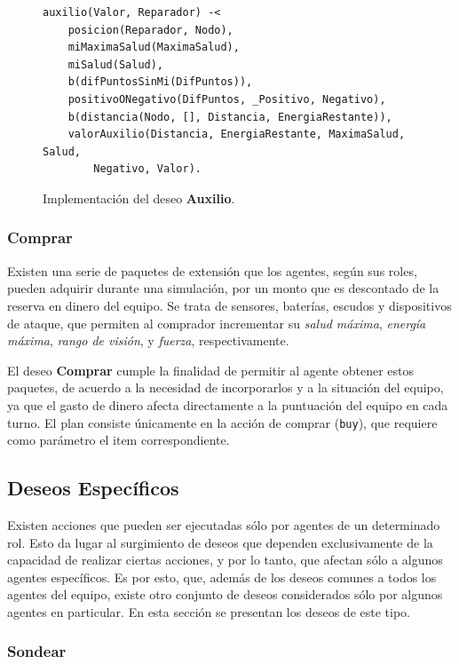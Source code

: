 \documentclass[oneside]{book}
\theoremstyle{definition}
\theoremstyle{example}
\begin{document}
\begin{figure}
\begin{verbatim}
auxilio(Valor, Reparador) -<
	posicion(Reparador, Nodo),
	miMaximaSalud(MaximaSalud),
	miSalud(Salud),
	b(difPuntosSinMi(DifPuntos)),
	positivoONegativo(DifPuntos, _Positivo, Negativo),
	b(distancia(Nodo, [], Distancia, EnergiaRestante)),
	valorAuxilio(Distancia, EnergiaRestante, MaximaSalud, Salud, 
		Negativo, Valor).  	
\end{verbatim}
\caption{Implementación del deseo \textbf{Auxilio}.}
\label{fig:deseoAuxilio}
\end{figure}	



	
\subsubsection{Comprar}

Existen una serie de paquetes de extensión que los agentes, según sus roles, pueden 
adquirir durante una simulación, por un monto que es descontado de la reserva en dinero
del equipo. Se trata de sensores, baterías, escudos y dispositivos de ataque, que permiten 
al comprador incrementar su \textit{salud máxima}, \textit{energía máxima}, 
\textit{rango de visión}, y \textit{fuerza}, respectivamente.

El deseo \textbf{Comprar} cumple la finalidad de permitir al agente obtener estos paquetes,
de acuerdo a la necesidad de incorporarlos y a la situación del equipo, ya que el gasto 
de dinero afecta directamente a la puntuación del equipo en cada turno. El plan consiste 
únicamente en la acción de comprar (\texttt{buy}), que requiere como parámetro el item 
correspondiente.		
	
\subsection{Deseos Específicos}

Existen acciones que pueden ser ejecutadas sólo por agentes de un determinado rol. Esto da 
lugar al surgimiento de deseos que dependen exclusivamente de la capacidad de realizar 
ciertas acciones, y por lo tanto, que afectan sólo a algunos agentes específicos. Es por esto, 
que, además de los deseos comunes a todos los agentes del equipo, existe otro conjunto de 
deseos considerados sólo por algunos agentes en particular. En esta sección se presentan 
los deseos de este tipo.


\subsubsection{Sondear}
\end{document}

